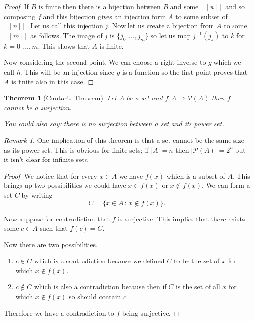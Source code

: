 \documentclass[
]{book}
\newtheorem{theorem}{Theorem}[chapter]
\theoremstyle{definition}
\theoremstyle{definition}
\theoremstyle{definition}
\theoremstyle{definition}
\theoremstyle{remark}
\newtheorem*{remark}{Remark}
\begin{document}
\begin{proof}
If \(B\) is finite then there is a bijection between \(B\) and some \([[n]]\) and so composing \(f\) and this bijection gives an injection form \(A\) to some subset of \([[n]]\). Let us call this injection \(j\). Now let us create a bijection from \(A\) to some \([[m]]\) as follows. The image of \(j\) is \(\{j_0, \dots, j_m\}\) so let us map \(j^{-1}(j_k)\) to \(k\) for \(k=0,\dots, m\). This shows that \(A\) is finite.

Now considering the second point. We can choose a right inverse to \(g\) which we call \(h\). This will be an injection since \(g\) is a function so the first point proves that \(A\) is finite also in this case.
\end{proof}

\begin{theorem}[Cantor's Theorem]
Let \(A\) be a set and \(f: A \rightarrow \mathcal{P}(A)\) then \(f\) cannot be a surjection.

You could also say: there is no surjection between a set and its power set.
\end{theorem}

\begin{remark}
One implication of this theorem is that a set cannot be the same size as its power set. This is obvious for finite sets; if \(|A|=n\) then \(|\mathcal{P}(A)|= 2^n\) but it isn't clear for infinite sets.
\end{remark}

\begin{proof}
We notice that for every \(x \in A\) we have \(f(x)\) which is a subset of \(A\). This brings up two possibilities we could have \(x \in f(x)\) or \(x \notin f(x)\). We can form a set \(C\) by writing
\[ C = \{ x \in A\,:\, x \notin f(x)\}.  \]

Now suppose for contradiction that \(f\) is surjective. This implies that there exists some \(c \in A\) such that \(f(c) = C\).

Now there are two possibilities.

\begin{enumerate}
\def\labelenumi{\arabic{enumi}.}
\item
  \(c \in C\) which is a contradiction because we defined \(C\) to be the set of \(x\) for which \(x \notin f(x)\).
\item
  \(c \notin C\) which is also a contradiction because then if \(C\) is the set of all \(x\) for which \(x \notin f(x)\) so should contain \(c\).
\end{enumerate}

Therefore we have a contradiction to \(f\) being surjective.
\end{proof}
\end{document}
